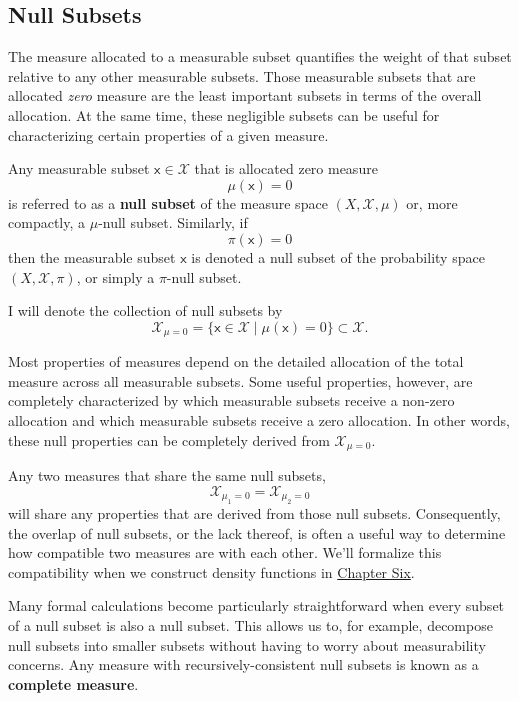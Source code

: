 \documentclass[
  letterpaper,
  DIV=11,
  numbers=noendperiod]{scrartcl}
\begin{document}
\subsection{Null Subsets}\label{sec:null}

The measure allocated to a measurable subset quantifies the weight of
that subset relative to any other measurable subsets. Those measurable
subsets that are allocated \emph{zero} measure are the least important
subsets in terms of the overall allocation. At the same time, these
negligible subsets can be useful for characterizing certain properties
of a given measure.

Any measurable subset \(\mathsf{x} \in \mathcal{X}\) that is allocated
zero measure \[
\mu(\mathsf{x}) = 0
\] is referred to as a \textbf{null subset} of the measure space
\((X, \mathcal{X}, \mu)\) or, more compactly, a \(\mu\)-null subset.
Similarly, if \[
\pi(\mathsf{x}) = 0
\] then the measurable subset \(\mathsf{x}\) is denoted a null subset of
the probability space \((X, \mathcal{X}, \pi)\), or simply a
\(\pi\)-null subset.

I will denote the collection of null subsets by \[
\mathcal{X}_{\mu = 0}
=
\{ \mathsf{x} \in \mathcal{X} \mid \mu(\mathsf{x}) = 0 \}
\subset \mathcal{X}.
\]

Most properties of measures depend on the detailed allocation of the
total measure across all measurable subsets. Some useful properties,
however, are completely characterized by which measurable subsets
receive a non-zero allocation and which measurable subsets receive a
zero allocation. In other words, these null properties can be completely
derived from \(\mathcal{X}_{\mu = 0}\).

Any two measures that share the same null subsets, \[
\mathcal{X}_{\mu_{1} = 0} = \mathcal{X}_{\mu_{2} = 0}
\] will share any properties that are derived from those null subsets.
Consequently, the overlap of null subsets, or the lack thereof, is often
a useful way to determine how compatible two measures are with each
other. We'll formalize this compatibility when we construct density
functions in
\href{http://www.symplectomorphic.com/assets/chapters_html/density_functions.html}{Chapter
Six}.

Many formal calculations become particularly straightforward when every
subset of a null subset is also a null subset. This allows us to, for
example, decompose null subsets into smaller subsets without having to
worry about measurability concerns. Any measure with
recursively-consistent null subsets is known as a \textbf{complete
measure}.
\end{document}
